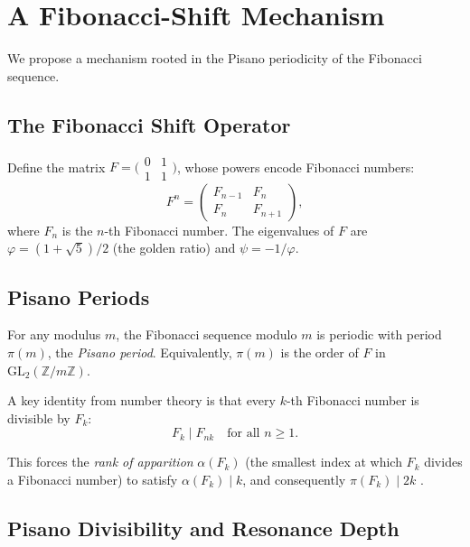 \documentclass[twocolumn,11pt]{article}
\begin{document}
\section{A Fibonacci-Shift Mechanism}
\label{sec:mechanism}

We propose a mechanism rooted in the Pisano periodicity of the
Fibonacci sequence.

\subsection{The Fibonacci Shift Operator}

Define the matrix $F = \bigl(\begin{smallmatrix} 0 & 1 \\ 1 & 1
\end{smallmatrix}\bigr)$, whose powers encode Fibonacci numbers:
\begin{equation}
F^n = \begin{pmatrix} F_{n-1} & F_n \\ F_n & F_{n+1} \end{pmatrix},
\end{equation}
where $F_n$ is the $n$-th Fibonacci number.  The eigenvalues of $F$
are $\varphi = (1+\sqrt{5})/2$ (the golden ratio) and
$\psi = -1/\varphi$.

\subsection{Pisano Periods}

For any modulus $m$, the Fibonacci sequence modulo $m$ is periodic
with period $\pi(m)$, the \emph{Pisano period}.  Equivalently,
$\pi(m)$ is the order of $F$ in $\mathrm{GL}_2(\mathbb{Z}/m\mathbb{Z})$.

A key identity from number theory is that every $k$-th Fibonacci
number is divisible by $F_k$:
\begin{equation}
F_k \mid F_{nk} \quad \text{for all } n \geq 1.
\label{eq:fibdiv}
\end{equation}

This forces the \emph{rank of apparition} $\alpha(F_k)$ (the smallest
index at which $F_k$ divides a Fibonacci number) to satisfy
$\alpha(F_k) \mid k$, and consequently $\pi(F_k) \mid 2k$
\citep{wall1960}.

\subsection{Pisano Divisibility and Resonance Depth}
\end{document}
